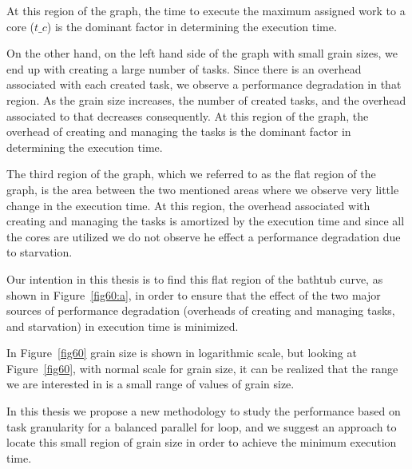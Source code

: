 At this region of the graph, the time to execute the maximum assigned work to a core ($t\_c$) is the dominant factor in determining the execution time.   

On the other hand, on the left hand side of the graph with small grain sizes, we end up with creating a large number of tasks. Since there is an overhead associated with each created task, we observe a performance degradation in that region. As the grain size increases, the number of created tasks, and the overhead associated to that decreases consequently. At this region of the graph, the overhead of creating and managing the tasks is the dominant factor in determining the execution time.   

The third region of the graph, which we referred to as the flat region of the graph, is the area between the two mentioned areas where we observe very little change in the execution time. At this region, the overhead associated with creating and managing the tasks is amortized by the execution time and since all the cores are utilized we do not observe he effect a performance degradation due to starvation.

Our intention in this thesis is to find this flat region of the bathtub curve, as shown in Figure~\ref{fig60:a}, in order to ensure that the effect of the two major sources of performance degradation (overheads of creating and managing tasks, and starvation) in execution time is minimized.

In Figure~\ref{fig60} grain size is shown in logarithmic scale, but looking at Figure~\ref{fig60}, with normal scale for grain size, it can be realized that the range we are interested in is a small range of values of grain size.  

In this thesis we propose a new methodology to study the performance based on task granularity for a balanced parallel for loop, and we suggest an approach to locate this small region of grain size in order to achieve the minimum execution time.
 
